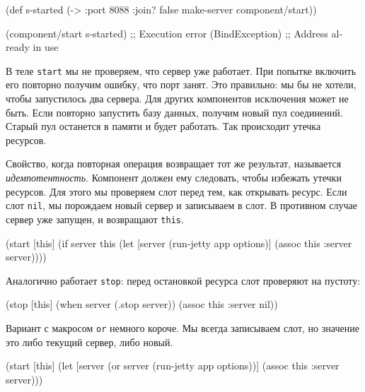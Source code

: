 \begin{english}
  \begin{clojure}
(def s-started (-> {:port 8088 :join? false}
                    make-server
                    component/start))

(component/start s-started)
;; Execution error (BindException)
;; Address already in use
  \end{clojure}
\end{english}

В теле \verb|start| мы не проверяем, что сервер уже работает. При попытке
включить его повторно получим ошибку, что порт занят. Это правильно: мы бы не
хотели, чтобы запустилось два сервера. Для других компонентов исключения может
не быть. Если повторно запустить базу данных, получим новый пул
соединений. Старый пул останется в памяти и будет работать. Так происходит
утечка ресурсов.


Свойство, когда повторная операция возвращает тот же результат, называется
\emph{идемпотентность}. Компонент должен ему следовать, чтобы избежать утечки
ресурсов. Для этого мы проверяем слот перед тем, как открывать ресурс. Если слот
\verb|nil|, мы порождаем новый сервер и записываем в слот. В противном случае
сервер уже запущен, и возвращают \verb|this|.

\begin{english}
  \begin{clojure}
(start [this]
  (if server
    this
    (let [server (run-jetty app options)]
      (assoc this :server server))))
  \end{clojure}
\end{english}

Аналогично работает \verb|stop|: перед остановкой ресурса слот проверяют на
пустоту:

\begin{english}
  \begin{clojure}
(stop [this]
  (when server
    (.stop server))
  (assoc this :server nil))
  \end{clojure}
\end{english}

Вариант с макросом \verb|or| немного короче. Мы всегда записываем слот, но
значение это либо текущий сервер, либо новый.

\begin{english}
  \begin{clojure}
(start [this]
  (let [server (or server (run-jetty app options))]
    (assoc this :server server)))
  \end{clojure}
\end{english}

